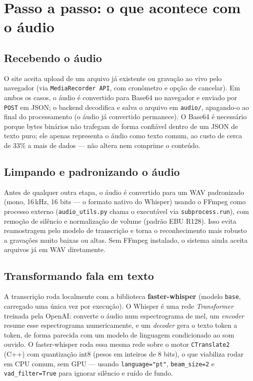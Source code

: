 \documentclass[11pt,a4paper]{article}
\begin{document}
\section{Passo a passo: o que acontece com o áudio}

\subsection{Recebendo o áudio}

O site aceita upload de um arquivo já existente ou gravação ao vivo pelo navegador (via \texttt{MediaRecorder API}, com cronômetro e opção de cancelar). Em ambos os casos, o áudio é convertido para Base64 no navegador e enviado por \texttt{POST} em JSON; o backend decodifica e salva o arquivo em \texttt{audio/}, apagando-o ao final do processamento (o áudio já convertido permanece). O Base64 é necessário porque bytes binários não trafegam de forma confiável dentro de um JSON de texto puro; ele apenas representa o áudio como texto comum, ao custo de cerca de 33\% a mais de dados --- não altera nem comprime o conteúdo.

\subsection{Limpando e padronizando o áudio}

Antes de qualquer outra etapa, o áudio é convertido para um WAV padronizado (mono, 16\,kHz, 16 bits --- o formato nativo do Whisper) usando o FFmpeg como processo externo (\texttt{audio\_utils.py} chama o executável via \texttt{subprocess.run}), com remoção de silêncio e normalização de volume (padrão EBU R128). Isso evita reamostragem pelo modelo de transcrição e torna o reconhecimento mais robusto a gravações muito baixas ou altas. Sem FFmpeg instalado, o sistema ainda aceita arquivos já em WAV diretamente.

\subsection{Transformando fala em texto}

A transcrição roda localmente com a biblioteca \textbf{faster-whisper} (modelo \texttt{base}, carregado uma única vez por execução). O Whisper é uma rede \emph{Transformer} treinada pela OpenAI: converte o áudio num espectrograma de mel, um \emph{encoder} resume esse espectrograma numericamente, e um \emph{decoder} gera o texto token a token, de forma parecida com um modelo de linguagem condicionado ao som ouvido. O faster-whisper roda essa mesma rede sobre o motor \texttt{CTranslate2} (C++) com quantização int8 (pesos em inteiros de 8 bits), o que viabiliza rodar em CPU comum, sem GPU --- usando \texttt{language="pt"}, \texttt{beam\_size=2} e \texttt{vad\_filter=True} para ignorar silêncio e ruído de fundo.
\end{document}
